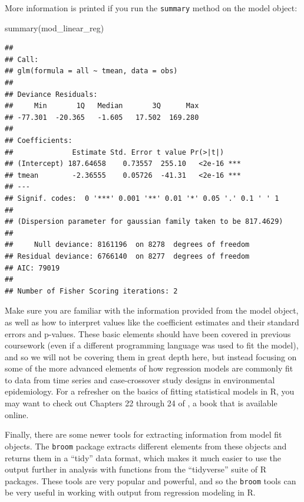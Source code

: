 \documentclass[
]{book}
\newenvironment{Shaded}{\begin{snugshade}}{\end{snugshade}}
\newcommand{\FunctionTok}[1]{\textcolor[rgb]{0.00,0.00,0.00}{#1}}
\newcommand{\NormalTok}[1]{#1}
\begin{document}
More information is printed if you run the \texttt{summary} method on the model
object:

\begin{Shaded}
\begin{Highlighting}[]
\FunctionTok{summary}\NormalTok{(mod\_linear\_reg)}
\end{Highlighting}
\end{Shaded}

\begin{verbatim}
## 
## Call:
## glm(formula = all ~ tmean, data = obs)
## 
## Deviance Residuals: 
##     Min       1Q   Median       3Q      Max  
## -77.301  -20.365   -1.605   17.502  169.280  
## 
## Coefficients:
##              Estimate Std. Error t value Pr(>|t|)    
## (Intercept) 187.64658    0.73557  255.10   <2e-16 ***
## tmean        -2.36555    0.05726  -41.31   <2e-16 ***
## ---
## Signif. codes:  0 '***' 0.001 '**' 0.01 '*' 0.05 '.' 0.1 ' ' 1
## 
## (Dispersion parameter for gaussian family taken to be 817.4629)
## 
##     Null deviance: 8161196  on 8278  degrees of freedom
## Residual deviance: 6766140  on 8277  degrees of freedom
## AIC: 79019
## 
## Number of Fisher Scoring iterations: 2
\end{verbatim}

Make sure you are familiar with the information provided from the model object,
as well as how to interpret values like the coefficient estimates and their
standard errors and p-values. These basic elements should have been covered in
previous coursework (even if a different programming language was used to fit
the model), and so we will not be covering them in great depth here, but instead
focusing on some of the more advanced elements of how regression models are
commonly fit to data from time series and case-crossover study designs in
environmental epidemiology. For a refresher on the basics of fitting
statistical models in R, you may want to check out Chapters 22 through 24 of
\citet{wickham2016r}, a book that is available online.

Finally, there are some newer tools for extracting information from model fit
objects. The \texttt{broom} package extracts different elements from these objects
and returns them in a ``tidy'' data format, which makes it much easier to use
the output further in analysis with functions from the ``tidyverse'' suite of
R packages. These tools are very popular and powerful, and so the \texttt{broom} tools
can be very useful in working with output from regression modeling in R.
\end{document}
